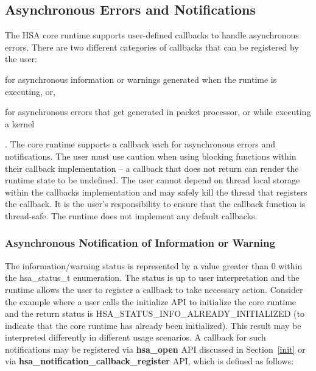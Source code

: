 \documentclass{book}
\newcommand{\reffun}[1]{\textbf{#1}}
\newcommand{\reftyp}[1]{#1}
\newcommand{\refenu}[1]{\reftyp{#1}}
\newenvironment{DIFnomarkup}{}{}
\begin{document}


\begin{DIFnomarkup}
\hypertarget{asyncerror}{}\subsection{Asynchronous Errors and
Notifications}\label{asyncerror}
\end{DIFnomarkup}

The HSA core runtime supports user-defined callbacks to handle
asynchronous errors. There are two different categories of callbacks
that can be registered by the user: \begin{inparaenum}[(i)] \item
for asynchronous information or warnings generated when the runtime
is executing, or, \item for asynchronous errors that get generated
in packet processor, or while executing a kernel \end{inparaenum}.
The core runtime supports a callback each for asynchronous errors
and notifications.
The user must use caution when using blocking functions within their
callback implementation -- a callback that does not return can
render the runtime state to be undefined. The user cannot depend on
thread local storage within the callbacks implementation and may
safely kill the thread that registers the callback. It is the user's
responsibility to ensure that the callback function is thread-safe.
The runtime does not implement any default callbacks.

\subsubsection{Asynchronous Notification of Information or
Warning}\label{asynnotif}
The information/warning status is represented by a value greater
than 0 within the \reftyp{hsa\_status\_t} enumeration. The status is
up to user interpretation and the runtime allows the user to
register a callback to take necessary action. Consider the example
where a user calls the initialize API to initialize the core runtime
and the return status is
\refenu{HSA\_STATUS\_INFO\_ALREADY\_INITIALIZED} (to indicate that
the core runtime has already been initialized). This result may be
interpreted differently in different usage scenarios. A callback for
such notifications may be registered via \reffun{hsa\_open} API
discussed in Section~\ref{init} or via
\reffun{hsa\_notification\_callback\_register} API, which is defined
as follows:
\end{document}
